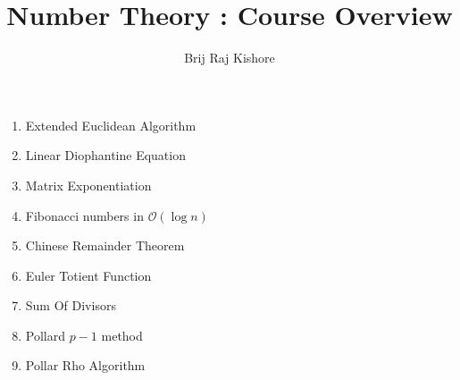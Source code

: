 \documentclass[12pt,twocolumn]{article}
\title{Number Theory : Course Overview}
\date{}
\author{Brij Raj Kishore}
\begin{document}
	\maketitle
		\begin{enumerate}
			\item Extended Euclidean Algorithm
			\item Linear Diophantine Equation
			\item Matrix Exponentiation
			\item Fibonacci numbers in $\mathcal{O}(\log n)$
			\item Chinese Remainder Theorem
			\item Euler Totient Function
			\item Sum Of Divisors
			\item Pollard $ p - 1$ method
			\item Pollar Rho Algorithm
		\end{enumerate}
\end{document}
